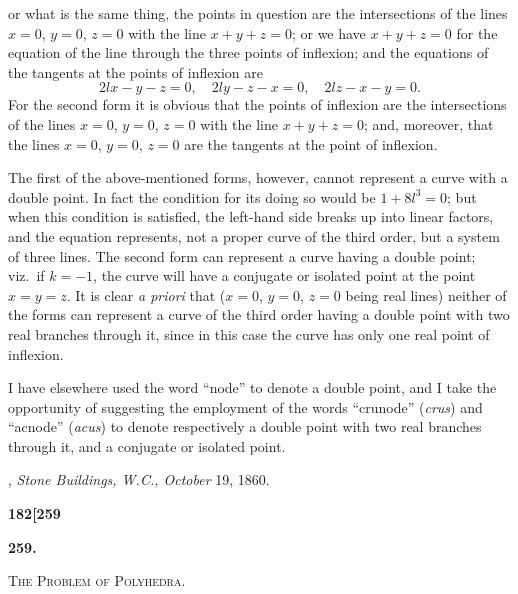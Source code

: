 \documentclass[11pt]{article}
\begin{document}
\medskip

\noindent or what is the same thing, the points in question are the intersections of the lines $x = 0$, $y = 0$, $z = 0$ with the line $x + y + z = 0$; or we have $x + y + z = 0$ for the equation of the line through the three points of inflexion; and the equations of the tangents at the points of inflexion are
\[
2lx - y - z = 0,\quad 2ly - z - x = 0,\quad 2lz - x - y = 0.
\]
For the second form it is obvious that the points of inflexion are the intersections of the lines $x = 0$, $y = 0$, $z = 0$ with the line $x + y + z = 0$; and, moreover, that the lines $x = 0$, $y = 0$, $z = 0$ are the tangents at the point of inflexion.

The first of the above-mentioned forms, however, cannot represent a curve with a double point. In fact the condition for its doing so would be $1 + 8l^3 = 0$; but when this condition is satisfied, the left-hand side breaks up into linear factors, and the equation represents, not a proper curve of the third order, but a system of three lines. The second form can represent a curve having a double point; viz.\ if $k = -1$, the curve will have a conjugate or isolated point at the point $x = y = z$. It is clear \textit{a priori} that ($x = 0$, $y = 0$, $z = 0$ being real lines) neither of the forms can represent a curve of the third order having a double point with two real branches through it, since in this case the curve has only one real point of inflexion.

I have elsewhere used the word ``node'' to denote a double point, and I take the opportunity of suggesting the employment of the words ``crunode'' (\textit{crus}) and ``acnode'' (\textit{acus}) to denote respectively a double point with two real branches through it, and a conjugate or isolated point.

\medskip

, \textit{Stone Buildings, W.C., October} 19, 1860.

\newpage


\noindent\textbf{182}\hfill\textbf{[259}

\bigskip

\begin{center}
{\large\bfseries 259.}

\medskip

{\scshape The Problem of Polyhedra.}
\end{center}
\end{document}
